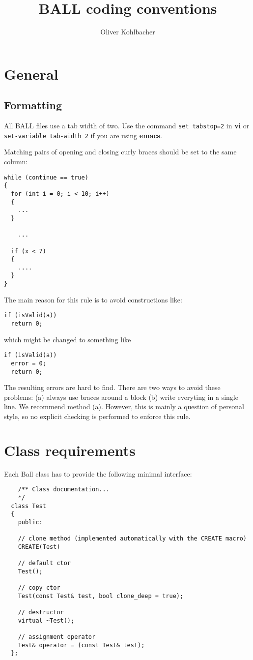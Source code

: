 \documentclass[a4]{article}
\title{BALL coding conventions}
\author{Oliver Kohlbacher}
\begin{document}
\maketitle
\section{General}

\subsection{Formatting}

All BALL files use a tab width of two. Use the command {\tt set tabstop=2} in
{\bf vi} or {\tt set-variable tab-width 2} if you are using {\bf emacs}.

Matching pairs of opening and closing curly braces should be set to the same
column:
\begin{verbatim}
while (continue == true)
{
  for (int i = 0; i < 10; i++)
  {
    ...
  }

 	...

  if (x < 7)
  {
    ....
  }
}
\end{verbatim}
The main reason for this rule is to avoid constructions like:

\begin{verbatim}
if (isValid(a))
  return 0;
\end{verbatim}

which might be changed to something like

\begin{verbatim}
if (isValid(a))
  error = 0;
  return 0;
\end{verbatim}

The resulting errors are hard to find. There are two ways to avoid these
problems: (a) always use braces around a block (b) write everyting in a single
line. We recommend method (a).
However, this is mainly a question of personal style, so no explicit checking
is performed to enforce this rule.



\section{Class requirements}

Each Ball class has to provide the following minimal interface:
\begin{verbatim}
	/** Class documentation... 
	*/
  class Test
  {
    public:

    // clone method (implemented automatically with the CREATE macro)
    CREATE(Test)    

    // default ctor
    Test();

    // copy ctor 
    Test(const Test& test, bool clone_deep = true);

    // destructor 
    virtual ~Test();
 
    // assignment operator
    Test& operator = (const Test& test);
  };
\end{verbatim}
\end{document}
